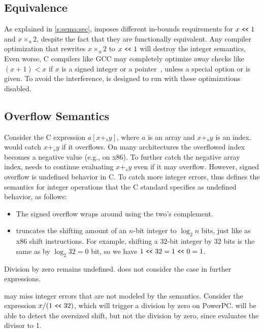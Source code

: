 \subsection{Equivalence}
\label{s:sema:eqv}

As explained in \autoref{s:sema:sec}, \sys imposes different in-bounds
requirements for $x \shl 1$ and $x \times_u 2$, despite the fact
that they are functionally equivalent.
Any compiler optimization that rewrites $x \times_u 2$ to $x \shl
1$ will destroy the integer semantics,
%
Even worse, C compilers like GCC may completely
optimize away checks like $(x + 1) < x$ if $x$ is a signed integer
or a pointer~\cite{gcc:signed-overflow,us-cert:gcc}, unless a special
option  or  is
given.  To avoid the interference, \sys is designed to run with
these optimizations disabled.

\subsection{Overflow Semantics}
\label{s:sema:def}

Consider the C expression $a[x +_s y]$, where $a$ is an array and
$x +_s y$ is an index.  \sys would catch $x +_s y$ if it overflows.
On many architectures the overflowed index becomes a negative value
(e.g., on x86).  To further catch the negative array index, \sys
needs to continue evaluating $x +_s y$ even if it may overflow.
However, signed overflow is undefined behavior in C.  To catch
more integer errors, \sys thus defines the semantics for integer
operations that the C standard specifies as undefined behavior, as
follows:
\begin{itemize}
\item
The signed overflow wraps around using the two's complement.
\item
\sys truncates the shifting amount of an $n$-bit integer to $\log_2
n$ bits, just like as x86 shift instructions.  For example, shifting
a 32-bit integer by 32 bits is the same as by $\log_2 32 = 0$ bit,
so we have $1 \shl 32 = 1 \shl 0 = 1$.
\end{itemize}
Division by zero remains undefined.  \sys does not consider the case
in further expressions.

\sys may miss integer errors that are not modeled by the semantics.
Consider the expression $x / (1 \shl 32)$, which will trigger a
division by zero on PowerPC.  \sys will be able to detect the
oversized shift, but not the division by zero, since \sys evaluates
the divisor to 1.

